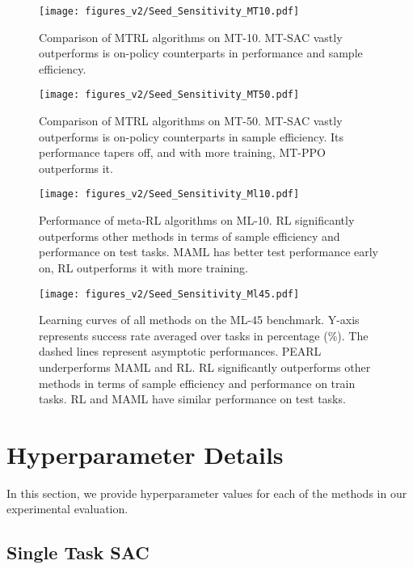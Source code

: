 \begin{figure}[H]
    \centering
    \texttt{[image: figures\_v2/Seed\_Sensitivity\_MT10.pdf]}
    \caption{Comparison of MTRL algorithms on MT-10. MT-SAC vastly outperforms is on-policy counterparts in performance and sample efficiency.}
    \label{fig:learningcurves}
\end{figure}
\begin{figure}[H]
    \centering
    \texttt{[image: figures\_v2/Seed\_Sensitivity\_MT50.pdf]}
    \vspace{-0.5cm}
    \caption{Comparison of MTRL algorithms on MT-50. MT-SAC vastly outperforms is on-policy counterparts in sample efficiency. Its performance tapers off, and with more training, MT-PPO outperforms it.}
    \label{fig:mt50-curve}
\end{figure}
\begin{figure}[H]
    \vspace{-2.5cm}
    \centering
    \texttt{[image: figures\_v2/Seed\_Sensitivity\_Ml10.pdf]}
    \caption{Performance of meta-RL algorithms on ML-10. RL significantly outperforms other methods in terms of sample efficiency and performance on test tasks. MAML has better test performance early on, RL outperforms it with more training.}
    \label{fig:ml10-curve}
\end{figure}
\begin{figure}[H]
\centering
    \texttt{[image: figures\_v2/Seed\_Sensitivity\_Ml45.pdf]}
    \caption{Learning curves of all methods on the ML-45 benchmark. Y-axis represents success rate averaged over tasks in percentage (\%). The dashed lines represent asymptotic performances. PEARL underperforms MAML and RL. RL significantly outperforms other methods in terms of sample efficiency and performance on train tasks. RL and MAML have similar performance on test tasks.}
    \label{fig:ml45-curve}
\end{figure}
\pagebreak{}

\section{Hyperparameter Details}
\label{app:hyperparameters}

In this section, we provide hyperparameter values for each of the methods in our experimental evaluation.

\subsection{Single Task SAC}

